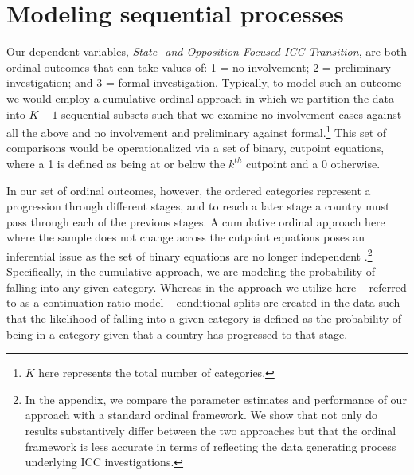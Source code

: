 
\section*{Modeling sequential processes}

Our dependent variables, \emph{State- and Opposition-Focused ICC Transition}, are both ordinal outcomes that can take values of: 1 = no involvement; 2 = preliminary investigation; and 3 = formal investigation. Typically, to model such an outcome we would employ a cumulative ordinal approach in which we partition the data into $K-1$ sequential subsets such that we examine no involvement cases against all the above and no involvement and preliminary against formal.\footnote{$K$ here represents the total number of categories.} This set of comparisons would be operationalized via a set of binary, cutpoint equations, where a 1 is defined as being at or below the $k^{th}$ cutpoint and a 0 otherwise.

In our set of ordinal outcomes, however, the ordered categories represent a progression through different stages, and to reach a later stage a country must pass through each of the previous stages. A cumulative ordinal approach here where the sample does not change across the cutpoint equations poses an inferential issue as the set of binary equations are no longer independent \citep{tutz1990sequential, have:uttal:1994, fienberg2007analysis, agresti:2010}.\footnote{In the appendix, we compare the parameter estimates and performance of our approach with a standard ordinal framework. We show that not only do results substantively differ between the two approaches but that the ordinal framework is less accurate in terms of reflecting the data generating process underlying ICC investigations.} Specifically, in the cumulative approach, we are modeling the probability of falling into any given category. Whereas in the approach we utilize here -- referred to as a continuation ratio model -- conditional splits are created in the data such that the likelihood of falling into a given category is defined as the probability of being in a category given that a country has progressed to that stage.

